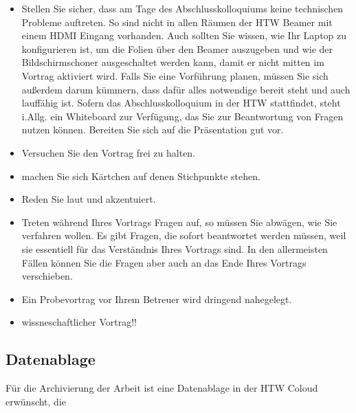 \begin{itemize}

\item 
Stellen Sie sicher, dass am Tage des Abschlusskolloquiums keine technischen Probleme auftreten. So sind nicht in allen Räumen der HTW Beamer mit einem HDMI Eingang vorhanden. Auch sollten Sie wissen, wie Ihr Laptop zu konfigurieren ist, um die Folien über den Beamer auszugeben und wie der Bildschirmschoner ausgeschaltet werden kann, damit er nicht mitten im Vortrag aktiviert wird. Falls Sie eine Vorführung planen, müssen Sie sich außerdem darum kümmern, dass dafür alles notwendige bereit steht und auch lauffähig ist. Sofern das Abschlusskolloquium in der HTW stattfindet, steht i.Allg. ein Whiteboard zur Verfügung, das Sie zur Beantwortung von Fragen nutzen können. Bereiten Sie sich auf die Präsentation gut vor. 


\item Versuchen Sie den Vortrag frei zu halten. 
\item machen Sie sich Kärtchen auf denen Stichpunkte stehen.
\item 
Reden Sie laut und akzentuiert. 
\item Treten während Ihres Vortrags Fragen auf, so müssen Sie abwägen, wie Sie verfahren wollen. Es gibt Fragen, die sofort beantwortet werden müssen, weil sie essentiell für das Verständnis Ihres Vortrags sind. In den allermeisten Fällen können Sie die Fragen aber auch an das Ende Ihres Vortrags verschieben.
\item Ein Probevortrag vor Ihrem Betreuer wird dringend nahegelegt.



\item wissneschaftlicher Vortrag!!
\end{itemize}



\subsection{Datenablage}
Für die Archivierung der Arbeit ist eine Datenablage in der HTW Coloud erwünscht, die 

